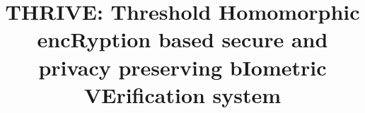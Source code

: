 \documentclass[journal]{IEEEtran}
\begin{document}
\title{THRIVE: Threshold Homomorphic encRyption based secure and privacy preserving bIometric VErification system}

\newcommand{\mehmet}[1]{\authnote{Mehmet}{#1}}
\newcommand{\cagatay}[1]{\authnote{Cagatay}{#1}}
\def\msk#1{\textcolor{red}{[[#1]]}}
\def\ck#1{\textcolor{blue}{[[#1]]}}

\makeatletter \def\@r@al{\raise\arrowlower}
\def\@lrulefill{\cleaders\hbox{$\mkern-2mu\@r@al\hbox{$-$}\mkern-2mu$}\hfill}
\def\@lendofrule{\@r@al\hbox{$-$}\mkern-4mu}
\def\@rendofrule{\mkern-4mu\@r@al\hbox{$-$}}
\def\@rafill{\mkern-6mu\@lrulefill\@rendofrule\@r@al\llap{$\rightarrow$}}
\def\@lafill{\m@th\@r@al\rlap{$\leftarrow$}\@lendofrule\@lrulefill\mkern-6mu}
\def\@rdfill{\mkern-6mu\@lrulefill\@rendofrule}
\def\@ldfill{\m@th\@lendofrule\@lrulefill\mkern-6mu} \newdimen\minarrowwidth
\minarrowwidth=0pt \newdimen\arrowwidth \newdimen\arrowlower \arrowlower=-4pt
\def\@showmessage#1{\setbox\@tempboxa\hbox{$#1$}
\ifdim\wd\@tempboxa<\minarrowwidth \arrowwidth\minarrowwidth \else
\arrowwidth\wd\@tempboxa \fi \hbox{$\m@th\displaystyle\mathop{\hbox to
\arrowwidth {$\m@th\@lrulefill$}}\limits^{\hfill\box\@tempboxa\hfill}$}}
\def\sends{\@sends} \def\@sends#1{\@ldfill\@showmessage{#1}\@rafill}
\def\receives{\@receives} \def\@receives#1{\@lafill\@showmessage{#1}\@rdfill}
\makeatother


\newcommand{\ignore}[1]{}
\newcommand{\com}[3]{\textrm{commit}$_{#1}(#2;#3)$}
\newcommand{\comh}[4]{\textrm{commit}$_{#1}^{#2}(#3;#4)$}
\newcommand{\comnor}[2]{\textrm{commit}$_{#1}(#2)$}
\pagestyle{plain}

\author{}




\maketitle
\end{document}
